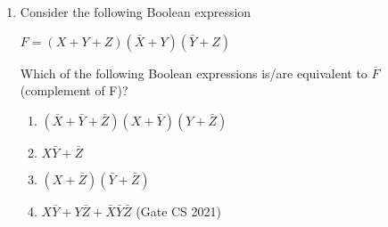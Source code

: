 \documentclass[12pt]{article}                         \usepackage{hyperref}                                 \usepackage{listings}
\date{\today}
\begin{document}
\maketitle{}
\begin{enumerate}
\item Consider the following Boolean expression 

            $F = (X+Y+Z)(\bar{X}+Y)(\bar{Y}+Z)$ 
       
Which of the following Boolean expressions is/are equivalent to $\overline{F}$ (complement of F)?
\begin{enumerate}                                     
\item $(\bar{X}+\bar{Y}+\bar{Z})(X+\bar{Y})(Y+\bar{Z})$
\item $X\bar{Y}+\bar{Z}$
\item $(X+\bar{Z})(\bar{Y}+\bar{Z})$
\item $X\bar{Y}+Y\bar{Z}+\bar{X}\bar{Y}\bar{Z}$ \hfill{(Gate CS 2021)}
\end{enumerate}
\end{enumerate}
\end{document}
